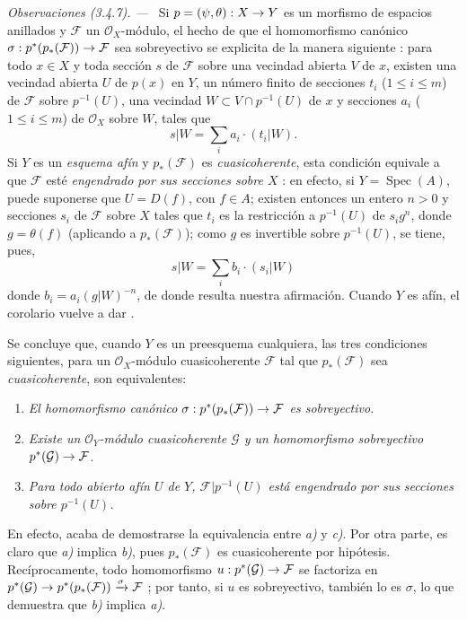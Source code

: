 \documentclass[oneside,10pt]{amsart}
\makeatletter
\renewcommand{\leq}{\leqslant}
\newcommand{\ega@arrow}[2]{\mathchoice{#1}{#2}{#2}{#2}}
\renewcommand{\to}{\ega@arrow{\longrightarrow}{\rightarrow}}
\newcommand{\oldpage}[2][]{\marginnote{\normalfont\footnotesize\textbf{#1}~|~#2}\ignorespaces}
\let\EGAOriginalLabel\label
\renewcommand{\label}[1]{\phantomsection\EGAOriginalLabel{#1}}
\makeatother
\begin{document}
\par\medskip\noindent\textit{Observaciones (3.4.7). ---\ }
\label{II.3.4.7-fr}
Si $p=(\psi,\theta):X\to Y$ es un morfismo de espacios anillados y $\mathcal{F}$ un $\mathcal{O}_X$-módulo, el hecho de que el homomorfismo canónico $\sigma:p^*(p_*(\mathcal{F}))\to\mathcal{F}$ sea sobreyectivo se explicita de la manera siguiente : para todo $x\in X$ y toda sección $s$ de $\mathcal{F}$ sobre una vecindad abierta $V$ de $x$, existen una vecindad abierta $U$ de $p(x)$ en $Y$, un número finito de secciones $t_i$ ($1\leq i\leq m$) de $\mathcal{F}$ sobre $p^{-1}(U)$, una vecindad $W\subset V\cap p^{-1}(U)$ de $x$ y secciones $a_i$ ($1\leq i\leq m$) de $\mathcal{O}_X$ sobre $W$, tales que
\[
  s|W=\sum_i a_i\cdot(t_i|W).
\]
Si $Y$ es un \emph{esquema afín} y $p_*(\mathcal{F})$ es \emph{cuasicoherente}, esta condición equivale a que $\mathcal{F}$ esté \emph{engendrado por sus secciones sobre $X$} : en efecto, si $Y=\operatorname{Spec}(A)$, puede suponerse que $U=D(f)$, con $f\in A$; existen entonces un entero $n>0$ y secciones $s_i$ de $\mathcal{F}$ sobre $X$ tales que $t_i$ es la restricción a $p^{-1}(U)$ de $s_ig^n$, donde $g=\theta(f)$ (aplicando  a $p_*(\mathcal{F})$); como $g$ es invertible sobre $p^{-1}(U)$, se tiene, pues,
\[
  s|W=\sum_i b_i\cdot(s_i|W)
\]
donde $b_i=a_i(g|W)^{-n}$, de donde resulta nuestra afirmación.
Cuando $Y$ es afín, el corolario  vuelve a dar .


Se concluye que, cuando $Y$ es un preesquema cualquiera, las tres condiciones 
\oldpage[II]{61}
siguientes, para un $\mathcal{O}_X$-módulo cuasicoherente $\mathcal{F}$ tal que $p_*(\mathcal{F})$ sea \emph{cuasicoherente}, son equivalentes:
\begin{enumerate}
  \item[a)] \emph{El homomorfismo canónico $\sigma:p^*(p_*(\mathcal{F}))\to\mathcal{F}$ es sobreyectivo.}
  \item[b)] \emph{Existe un $\mathcal{O}_Y$-módulo cuasicoherente $\mathcal{G}$ y un homomorfismo sobreyectivo $p^*(\mathcal{G})\to\mathcal{F}$.}
  \item[c)] \emph{Para todo abierto afín $U$ de $Y$, $\mathcal{F}|p^{-1}(U)$ está engendrado por sus secciones sobre $p^{-1}(U)$.}
\end{enumerate}

En efecto, acaba de demostrarse la equivalencia entre \emph{a)} y \emph{c)}.
Por otra parte, es claro que \emph{a)} implica \emph{b)}, pues $p_*(\mathcal{F})$ es cuasicoherente por hipótesis.
Recíprocamente, todo homomorfismo $u:p^*(\mathcal{G})\to\mathcal{F}$ se factoriza en
$p^*(\mathcal{G})\to p^*(p_*(\mathcal{F}))\xrightarrow{\sigma}\mathcal{F}$
; por tanto, si $u$ es sobreyectivo, también lo es $\sigma$, lo que demuestra que \emph{b)} implica \emph{a)}.
\end{document}
